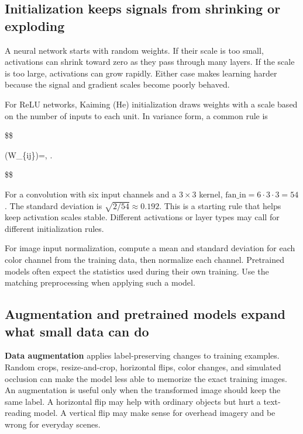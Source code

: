 \subsection{Initialization keeps signals from shrinking or exploding}\label{04-visual-computing-ii-ch031-initialization-keeps-signals-from-shrinking-or-exploding}

A neural network starts with random weights. If their scale is too small, activations can shrink toward zero as they pass through many layers. If the scale is too large, activations can grow rapidly. Either case makes learning harder because the signal and gradient scales become poorly behaved.

For ReLU networks, Kaiming (He) initialization draws weights with a scale based on the number of inputs to each unit. In variance form, a common rule is

\$\$

(W\_\{ij\})=, \quad{}.

\$\$

For a convolution with six input channels and a \(3\times3\) kernel, \(\text{fan\_in}=6\cdot3\cdot3=54\). The standard deviation is \(\sqrt{2/54}\approx0.192\). This is a starting rule that helps keep activation scales stable. Different activations or layer types may call for different initialization rules.

For image input normalization, compute a mean and standard deviation for each color channel from the training data, then normalize each channel. Pretrained models often expect the statistics used during their own training. Use the matching preprocessing when applying such a model.

\subsection{Augmentation and pretrained models expand what small data can do}\label{04-visual-computing-ii-ch031-augmentation-and-pretrained-models-expand-what-small-data-can-do}

\textbf{Data augmentation} applies label-preserving changes to training examples. Random crops, resize-and-crop, horizontal flips, color changes, and simulated occlusion can make the model less able to memorize the exact training images. An augmentation is useful only when the transformed image should keep the same label. A horizontal flip may help with ordinary objects but hurt a text-reading model. A vertical flip may make sense for overhead imagery and be wrong for everyday scenes.

